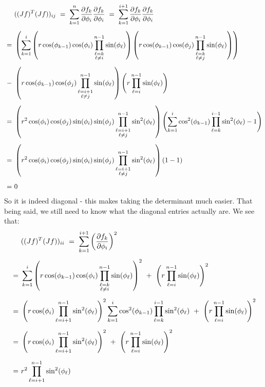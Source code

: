 \begin{align*}
    & ((Jf)^{T}(Jf))_{ij} \ = \ \sum_{k=1}^{n}\frac{\p f_{k}}{\p\phi_{i}}
        \frac{\p f_{k}}{\p\phi_{i}} \ = \ \sum_{k=1}^{i+1}\frac{\p f_{k}}
        {\p\phi_{i}}\frac{\p f_{k}}{\p\phi_{i}} \vsp
    \ = \ & \left(\sum_{k=1}^{i}\left(r\cos(\phi_{k-1})\cos(\phi_{i})
        \prod_{\substack{\ell=k\\ \ell\neq i}}^{n-1}\sin(\phi_{\ell})\right)
        \left(r\cos(\phi_{k-1})\cos(\phi_{j})\prod_{\substack{\ell=k\\
        \ell\neq j}} ^{n-1}\sin(\phi_{\ell})\right)\right) \vsp
    \ - \ & \left(r\cos(\phi_{k-1})\cos(\phi_{j}) \prod_{\substack{\ell=i+1\\
        \ell\neq j}} ^{n-1}\sin(\phi_{\ell})\right)\left(r\prod_{\ell=i}^{n-1}
        \sin(\phi_{\ell})\right) \vsp
    \ = \ & \left(r^{2}\cos(\phi_{i})\cos(\phi_{j})\sin(\phi_{i})\sin(\phi_{j})
        \prod_{\substack{\ell=i+1\\ \ell\neq j}}^{n-1}\sin^{2}(\phi_{\ell})
        \right)\left(\sum_{k=1}^{i}\cos^{2}(\phi_{k-1}) \prod_{\ell=k}^{i-1}
        \sin^{2}(\phi_{\ell})-1\right) \vsp
    \ = \ & \left(r^{2}\cos(\phi_{i})\cos(\phi_{j})\sin(\phi_{i})\sin(\phi_{j})
        \prod_{\substack{\ell=i+1\\ \ell\neq j}}^{n-1}\sin^{2}(\phi_{\ell})
        \right)\left(1-1\right) \vsp
    \ = \ & 0
\end{align*}
So it is indeed diagonal - this makes taking the determinant much easier. That
being said, we still need to know what the diagonal entries actually are. We see
that:
\begin{align*}
    & ((Jf)^{T}(Jf))_{ii} \ = \
        \sum_{k=1}^{i+1}\left(\frac{\p f_{k}}{\p\phi_{i}}\right)^{2} \vsp
    \ = \ & \sum_{k=1}^{i}\left(r\cos(\phi_{k-1})\cos(\phi_{i})
        \prod_{\substack{\ell=k\\ \ell\neq i}}^{n-1}\sin(\phi_{\ell})\right)^{2}
        \ + \ \left(r\prod_{\ell=i}^{n-1}\sin(\phi_{\ell})\right)^{2} \vsp
    \ = \ & \left(r\cos(\phi_{i})\prod_{\ell=i+1}^{n-1}\sin^{2}(\phi_{\ell})
        \right)^{2}\sum_{k=1}^{i}\cos^{2}(\phi_{k-1}) \prod_{\ell=k}^{i-1}
        \sin^{2}(\phi_{\ell}) \ + \ \left(r\prod_{\ell=i}^{n-1}
        \sin(\phi_{\ell})\right)^{2} \vsp
    \ = \ & \left(r\cos(\phi_{i})\prod_{\ell=i+1}^{n-1}\sin^{2}(\phi_{\ell})
        \right)^{2} \ + \ \left(r\prod_{\ell=i}^{n-1}
        \sin(\phi_{\ell})\right)^{2} \vsp
    \ = \ & r^{2}\prod_{\ell=i+1}^{n-1}\sin^{2}(\phi_{\ell})
\end{align*}
